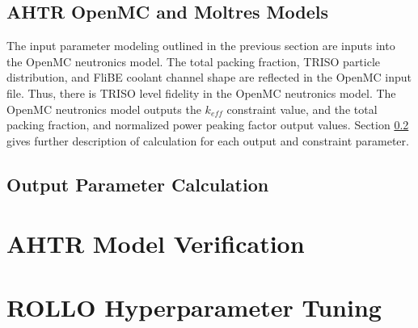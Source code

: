 \subsection{AHTR OpenMC and Moltres Models}
\label{sec:ahtr-moltres-hom}
The input parameter modeling outlined in the previous section are inputs into 
the OpenMC neutronics model. 
The total packing fraction, TRISO particle distribution, and FliBE coolant 
channel shape are reflected in the OpenMC input file. 
Thus, there is TRISO level fidelity in the OpenMC neutronics model. 
The OpenMC neutronics model outputs the $k_{eff}$ constraint value, and the 
total packing fraction, and normalized power peaking factor output values. 
Section \ref{sec:ahtr_slab_output} gives further description of calculation for 
each output and constraint parameter.

\subsection{Output Parameter Calculation}
\label{sec:ahtr_slab_output}

\section{AHTR Model Verification}

\section{ROLLO Hyperparameter Tuning}